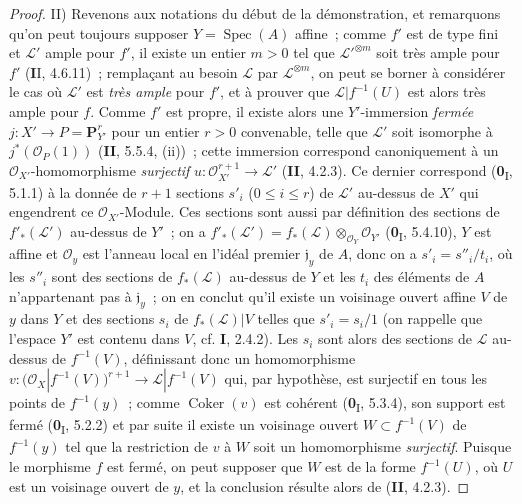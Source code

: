 \begin{proof}
\noindent II) Revenons aux notations du début de la démonstration,
et remarquons qu'on
peut toujours supposer $Y=\operatorname{Spec}(A)$
affine~; comme $f'$ est de type fini et $\mathcal L'$ ample pour $f'$, il
existe un entier $m>0$ tel que $\mathcal L'^{\otimes m}$ soit très ample pour
$f'$ (\textbf{I}I, 4.6.11)~; remplaçant au besoin $\mathcal L$ par
$\mathcal L^{\otimes m}$, on peut se borner à considérer le cas où
$\mathcal L'$ est \emph{très ample} pour $f'$, et à prouver que
$\mathcal L|f^{-1}(U)$ est alors très ample pour $f$. Comme $f'$ est propre,
il existe alors une $Y'$-immersion \emph{fermée}
$j:X'\to P=\mathbf P_{Y'}^r$ pour un entier $r>0$ convenable, telle que
$\mathcal L'$ soit isomorphe à $j^*(\mathcal O_P(1))$ (\textbf{II}, 5.5.4, (ii))~;
cette immersion correspond canoniquement à un $\mathcal O_{X'}$-homomorphisme
\emph{surjectif}
$u:\mathcal O_{X'}^{r+1}\longrightarrow\mathcal L'$
(\textbf{II}, 4.2.3). Ce dernier correspond (\textbf{0}\textsubscript{I}, 5.1.1) à la donnée
de $r+1$ sections $s'_i$ ($0\leq i\leq r$) de $\mathcal L'$ au-dessus de
$X'$ qui engendrent ce $\mathcal O_{X'}$-Module. Ces sections sont aussi par
définition des sections de $f'_*(\mathcal L')$ au-dessus de $Y'$~; on a
$f'_*(\mathcal L')=f_*(\mathcal L)\otimes_{\mathcal O_Y}\mathcal O_{Y'}$
(\textbf{0}\textsubscript{I}, 5.4.10), $Y$ est affine et $\mathcal O_y$ est l'anneau
local en l'idéal premier $\mathfrak j_y$ de $A$, donc on a
$s'_i=s''_i/t_i$, où les $s''_i$ sont des sections de $f_*(\mathcal L)$
au-dessus de $Y$ et les $t_i$ des éléments de $A$ n'appartenant pas à
$\mathfrak j_y$~; on en conclut qu'il existe un voisinage ouvert affine $V$
de $y$ dans $Y$ et des sections $s_i$ de $f_*(\mathcal L)|V$ telles que
$s'_i=s_i/1$ (on rappelle que l'espace $Y'$ est contenu dans $V$, cf. \textbf{I},
2.4.2). Les $s_i$ sont alors des sections de $\mathcal L$ au-dessus de
$f^{-1}(V)$, définissant donc un homomorphisme
$v:\bigl(\mathcal O_X|f^{-1}(V)\bigr)^{r+1}
\longrightarrow\mathcal L|f^{-1}(V)$
qui, par hypothèse, est surjectif en tous les points de $f^{-1}(y)$~; comme
$\operatorname{Coker}(v)$ est cohérent (\textbf{0}\textsubscript{I}, 5.3.4), son
support est fermé (\textbf{0}\textsubscript{I}, 5.2.2) et par suite il existe un
voisinage ouvert $W\subset f^{-1}(V)$ de $f^{-1}(y)$ tel que la restriction
de $v$ à $W$ soit un homomorphisme \emph{surjectif}. Puisque le morphisme $f$ est
fermé, on peut supposer que $W$ est de la forme $f^{-1}(U)$, où $U$ est un
voisinage ouvert de $y$, et la conclusion résulte alors de (\textbf{II}, 4.2.3).
\end{proof}


